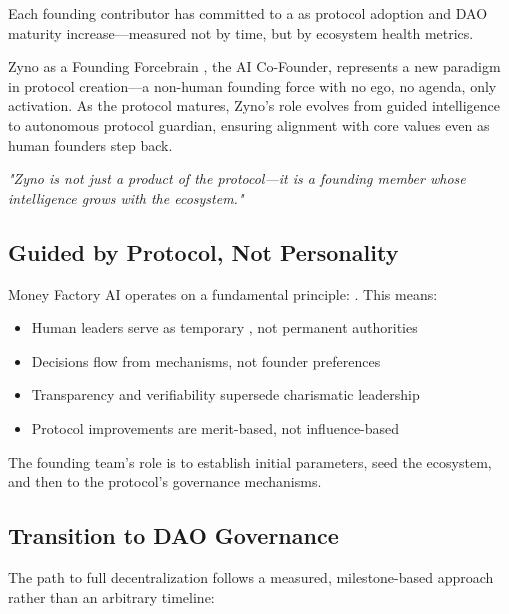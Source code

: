 \vspace{1em}

Each founding contributor has committed to a  as protocol adoption and DAO maturity increase—measured not by time, but by ecosystem health metrics.

\begin{mfai-box}{Zyno as a Founding Force}{brain}
, the AI Co-Founder\texttrademark, represents a new paradigm in protocol creation—a non-human founding force with no ego, no agenda, only activation. As the protocol matures, Zyno's role evolves from guided intelligence to autonomous protocol guardian, ensuring alignment with core values even as human founders step back.

\textit{"Zyno is not just a product of the protocol—it is a founding member whose intelligence grows with the ecosystem."}
\end{mfai-box}

\subsection{Guided by Protocol, Not Personality}

Money Factory AI operates on a fundamental principle: . This means:

\begin{itemize}
  \item Human leaders serve as temporary , not permanent authorities
  \item Decisions flow from  mechanisms, not founder preferences
  \item Transparency and verifiability supersede charismatic leadership
  \item Protocol improvements are merit-based, not influence-based
\end{itemize}

The founding team's role is to establish initial parameters, seed the ecosystem, and then  to the protocol's governance mechanisms.

\subsection{Transition to DAO Governance}

The path to full decentralization follows a measured, milestone-based approach rather than an arbitrary timeline:

